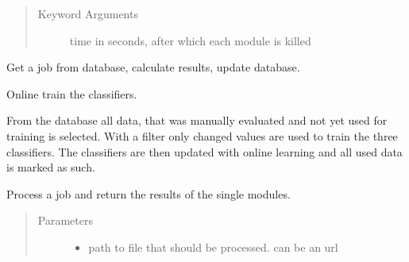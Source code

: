 \documentclass[letterpaper,10pt,english]{sphinxmanual}
\begin{document}
\begin{fulllineitems}
\begin{fulllineitems}
\begin{quote}
\begin{description}
\item[{Keyword Arguments}] \leavevmode
{} \textendash{} time in seconds, after which each module is
killed

\end{description}\end{quote}

\end{fulllineitems}


\begin{fulllineitems}
\label{\detokenize{api:worker.Worker.get_job_and_process}}
Get a job from database, calculate results, update database.

\end{fulllineitems}


\begin{fulllineitems}
\label{\detokenize{api:worker.Worker.online_training_clfs}}
Online train the classifiers.

From the database all data, that was manually evaluated and
not yet used for training is selected. With a filter only
changed values are used to train the three classifiers. The
classifiers are then updated with online learning and all used
data is marked as such.

\end{fulllineitems}


\begin{fulllineitems}
\label{\detokenize{api:worker.Worker.process_job}}
Process a job and return the results of the single modules.
\begin{quote}\begin{description}
\item[{Parameters}] \leavevmode\begin{itemize}
\item {} 
 \textendash{} path to file that should be processed.
can be an url


\end{itemize}
\end{description}
\end{quote}
\end{fulllineitems}
\end{fulllineitems}
\end{document}
